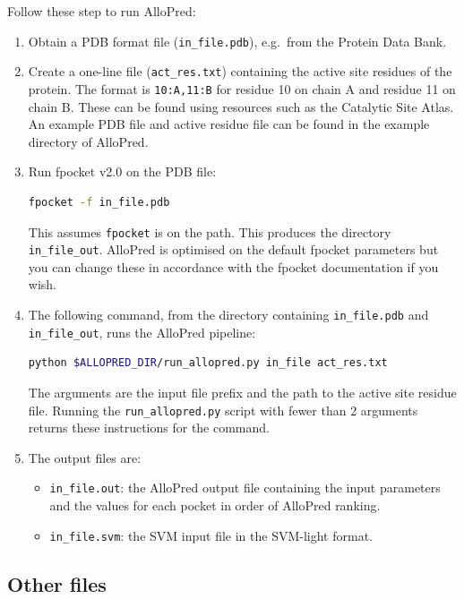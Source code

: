 Follow these step to run AlloPred:

\begin{enumerate}
\item Obtain a PDB format file (\verb|in_file.pdb|), e.g.\ from the Protein Data Bank.

\item Create a one-line file (\verb|act_res.txt|) containing the active site residues of the protein. The format is \verb|10:A,11:B| for residue 10 on chain A and residue 11 on chain B. These can be found using resources such as the Catalytic Site Atlas. An example PDB file and active residue file can be found in the example directory of AlloPred.

\item Run fpocket v2.0 on the PDB file:
\begin{lstlisting}[language=bash]
    fpocket -f in_file.pdb
\end{lstlisting}
This assumes \verb|fpocket| is on the path. This produces the directory \verb|in_file_out|. AlloPred is optimised on the default fpocket parameters but you can change these in accordance with the fpocket documentation if you wish.

\item The following command, from the directory containing \verb|in_file.pdb| and \verb|in_file_out|, runs the AlloPred pipeline:
\begin{lstlisting}[language=bash]
    python $ALLOPRED_DIR/run_allopred.py in_file act_res.txt
\end{lstlisting}
The arguments are the input file prefix and the path to the active site residue file. Running the \verb|run_allopred.py| script with fewer than 2 arguments returns these instructions for the command.

\item The output files are:
    \begin{itemize}
    \item \verb|in_file.out|: the AlloPred output file containing the input parameters and the values for each pocket in order of AlloPred ranking.
    \item \verb|in_file.svm|: the SVM input file in the SVM-light format.
    \end{itemize}
\end{enumerate}


\subsection{Other files}

